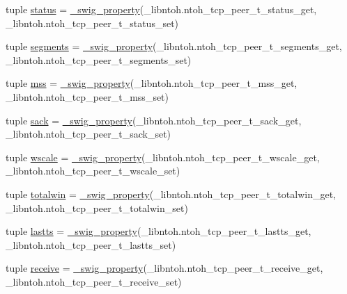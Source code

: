 \begin{DoxyCompactItemize}
\item 
tuple \hyperlink{classlibntoh_1_1ntoh__tcp__peer__t_ad7843c85abee4764c9e717a8db8cb3a5}{status} = \hyperlink{namespacelibntoh_ae6f5626f776538e0cdb00e75ca1c96c9}{\-\_\-swig\-\_\-property}(\-\_\-libntoh.\-ntoh\-\_\-tcp\-\_\-peer\-\_\-t\-\_\-status\-\_\-get, \-\_\-libntoh.\-ntoh\-\_\-tcp\-\_\-peer\-\_\-t\-\_\-status\-\_\-set)
\item 
tuple \hyperlink{classlibntoh_1_1ntoh__tcp__peer__t_a54b6380f989a7f1215352bd7588e082d}{segments} = \hyperlink{namespacelibntoh_ae6f5626f776538e0cdb00e75ca1c96c9}{\-\_\-swig\-\_\-property}(\-\_\-libntoh.\-ntoh\-\_\-tcp\-\_\-peer\-\_\-t\-\_\-segments\-\_\-get, \-\_\-libntoh.\-ntoh\-\_\-tcp\-\_\-peer\-\_\-t\-\_\-segments\-\_\-set)
\item 
tuple \hyperlink{classlibntoh_1_1ntoh__tcp__peer__t_aecdeb465bed15a6124eddc5069330a88}{mss} = \hyperlink{namespacelibntoh_ae6f5626f776538e0cdb00e75ca1c96c9}{\-\_\-swig\-\_\-property}(\-\_\-libntoh.\-ntoh\-\_\-tcp\-\_\-peer\-\_\-t\-\_\-mss\-\_\-get, \-\_\-libntoh.\-ntoh\-\_\-tcp\-\_\-peer\-\_\-t\-\_\-mss\-\_\-set)
\item 
tuple \hyperlink{classlibntoh_1_1ntoh__tcp__peer__t_ae1f4a14905497ecba8d6687be3b9bcdd}{sack} = \hyperlink{namespacelibntoh_ae6f5626f776538e0cdb00e75ca1c96c9}{\-\_\-swig\-\_\-property}(\-\_\-libntoh.\-ntoh\-\_\-tcp\-\_\-peer\-\_\-t\-\_\-sack\-\_\-get, \-\_\-libntoh.\-ntoh\-\_\-tcp\-\_\-peer\-\_\-t\-\_\-sack\-\_\-set)
\item 
tuple \hyperlink{classlibntoh_1_1ntoh__tcp__peer__t_a17fc4fd78c94de2e5155e43de064f36c}{wscale} = \hyperlink{namespacelibntoh_ae6f5626f776538e0cdb00e75ca1c96c9}{\-\_\-swig\-\_\-property}(\-\_\-libntoh.\-ntoh\-\_\-tcp\-\_\-peer\-\_\-t\-\_\-wscale\-\_\-get, \-\_\-libntoh.\-ntoh\-\_\-tcp\-\_\-peer\-\_\-t\-\_\-wscale\-\_\-set)
\item 
tuple \hyperlink{classlibntoh_1_1ntoh__tcp__peer__t_a2806f6eb15dc5af0fbc1f184de81c626}{totalwin} = \hyperlink{namespacelibntoh_ae6f5626f776538e0cdb00e75ca1c96c9}{\-\_\-swig\-\_\-property}(\-\_\-libntoh.\-ntoh\-\_\-tcp\-\_\-peer\-\_\-t\-\_\-totalwin\-\_\-get, \-\_\-libntoh.\-ntoh\-\_\-tcp\-\_\-peer\-\_\-t\-\_\-totalwin\-\_\-set)
\item 
tuple \hyperlink{classlibntoh_1_1ntoh__tcp__peer__t_a2858fd84349a5843a79dd5daf529c04d}{lastts} = \hyperlink{namespacelibntoh_ae6f5626f776538e0cdb00e75ca1c96c9}{\-\_\-swig\-\_\-property}(\-\_\-libntoh.\-ntoh\-\_\-tcp\-\_\-peer\-\_\-t\-\_\-lastts\-\_\-get, \-\_\-libntoh.\-ntoh\-\_\-tcp\-\_\-peer\-\_\-t\-\_\-lastts\-\_\-set)
\item 
tuple \hyperlink{classlibntoh_1_1ntoh__tcp__peer__t_abe7dc0678d2658dea89330f2a7d15b7c}{receive} = \hyperlink{namespacelibntoh_ae6f5626f776538e0cdb00e75ca1c96c9}{\-\_\-swig\-\_\-property}(\-\_\-libntoh.\-ntoh\-\_\-tcp\-\_\-peer\-\_\-t\-\_\-receive\-\_\-get, \-\_\-libntoh.\-ntoh\-\_\-tcp\-\_\-peer\-\_\-t\-\_\-receive\-\_\-set)
\end{DoxyCompactItemize}


